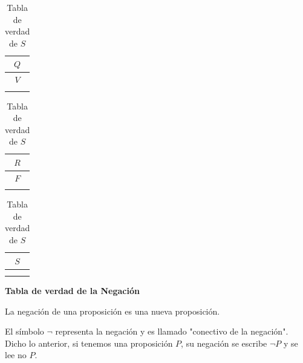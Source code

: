 \documentclass[letterpaper, twoside]{article}
\begin{document}
\begin{table}[htbp]

  \centering
    \begin{minipage}[t]{0.31\textwidth}
      \centering
      \begin{tabular}{|c|}
        \hline
        $Q$ \\ \hline
        $V$ \\ \hline
            \\ 
        \hline
      \end{tabular}
      \caption*{Tabla de verdad de $Q$}
    \end{minipage}%
    \hfill
    \begin{minipage}[t]{0.31\textwidth}
      \centering
      \begin{tabular}{|c|}
        \hline
        $R$ \\ \hline
        $F$ \\ \hline
            \\ 
        \hline
      \end{tabular}
      \caption*{Tabla de verdad de $R$}
    \end{minipage}%
    \hfill
    \begin{minipage}[t]{0.31\textwidth}
      \centering
      \begin{tabular}{|c|}
        \hline
        $S$ \\ \hline
            \\ \hline
            \\ 
        \hline
      \end{tabular}
      \caption*{Tabla de verdad de $S$}
    \end{minipage}

\end{table}

\vspace{1cm}

\textbf{Tabla de verdad de la Negación}

La negación de una proposición es una nueva proposición.\par

\vspace{.5cm}

El símbolo $\boldsymbol{\neg}$ representa la negación y es llamado "conectivo de la negación". Dicho lo anterior, si tenemos una proposición $P$, su negación se escribe $\neg P$ y se lee no $P$.\par

\newpage
\end{document}
